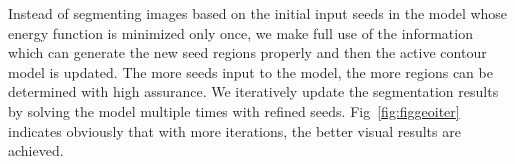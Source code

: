 \documentclass{article}
\begin{document}
Instead of segmenting images based on the initial input seeds in the model whose energy function is minimized only once, we make full use of the information which can generate the new seed regions properly and then the active contour model is updated. The more seeds input to the model, the more regions can be determined with high assurance. We iteratively update the segmentation results by solving the model multiple times with refined seeds. Fig~\ref{fig:figgeoiter} indicates obviously that with more iterations, the better visual results are achieved.
%
\end{document}

